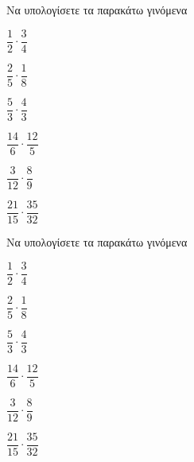 Να υπολογίσετε τα παρακάτω γινόμενα
\begin{multicols}{3}
\begin{alist}
\item $ \dfrac{1}{2}\cdot\dfrac{3}{4} $
\item $ \dfrac{2}{5}\cdot\dfrac{1}{8} $
\item $ \dfrac{5}{3}\cdot\dfrac{4}{3} $
\item $ \dfrac{14}{6}\cdot\dfrac{12}{5} $
\item $ \dfrac{3}{12}\cdot\dfrac{8}{9} $
\item $ \dfrac{21}{15}\cdot\dfrac{35}{32} $
\end{alist}
\end{multicols}
Να υπολογίσετε τα παρακάτω γινόμενα
\begin{multicols}{3}
\begin{alist}
\item $ \dfrac{1}{2}\cdot\dfrac{3}{4} $
\item $ \dfrac{2}{5}\cdot\dfrac{1}{8} $
\item $ \dfrac{5}{3}\cdot\dfrac{4}{3} $
\item $ \dfrac{14}{6}\cdot\dfrac{12}{5} $
\item $ \dfrac{3}{12}\cdot\dfrac{8}{9} $
\item $ \dfrac{21}{15}\cdot\dfrac{35}{32} $
\end{alist}
\end{multicols}
